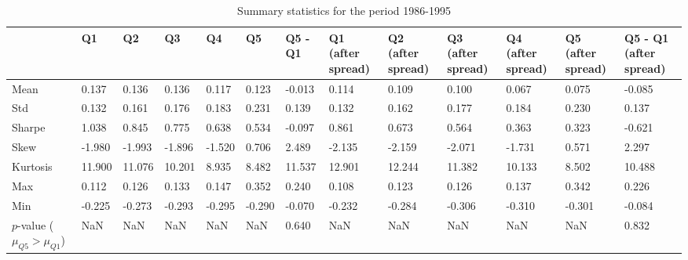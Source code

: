 \begin{table}
\caption{Summary statistics for the period 1986-1995}
\label{tab:summary_1986_1995}
\begin{tabular}{lllllllllllll}
\toprule
 & Q1 & Q2 & Q3 & Q4 & Q5 & Q5 - Q1 & Q1 (after spread) & Q2 (after spread) & Q3 (after spread) & Q4 (after spread) & Q5 (after spread) & Q5 - Q1 (after spread) \\
\midrule
Mean & 0.137 & 0.136 & 0.136 & 0.117 & 0.123 & -0.013 & 0.114 & 0.109 & 0.100 & 0.067 & 0.075 & -0.085 \\
Std & 0.132 & 0.161 & 0.176 & 0.183 & 0.231 & 0.139 & 0.132 & 0.162 & 0.177 & 0.184 & 0.230 & 0.137 \\
Sharpe & 1.038 & 0.845 & 0.775 & 0.638 & 0.534 & -0.097 & 0.861 & 0.673 & 0.564 & 0.363 & 0.323 & -0.621 \\
Skew & -1.980 & -1.993 & -1.896 & -1.520 & 0.706 & 2.489 & -2.135 & -2.159 & -2.071 & -1.731 & 0.571 & 2.297 \\
Kurtosis & 11.900 & 11.076 & 10.201 & 8.935 & 8.482 & 11.537 & 12.901 & 12.244 & 11.382 & 10.133 & 8.502 & 10.488 \\
Max & 0.112 & 0.126 & 0.133 & 0.147 & 0.352 & 0.240 & 0.108 & 0.123 & 0.126 & 0.137 & 0.342 & 0.226 \\
Min & -0.225 & -0.273 & -0.293 & -0.295 & -0.290 & -0.070 & -0.232 & -0.284 & -0.306 & -0.310 & -0.301 & -0.084 \\
$p$-value ($\mu_{Q5} > \mu_{Q1}$) & NaN & NaN & NaN & NaN & NaN & 0.640 & NaN & NaN & NaN & NaN & NaN & 0.832 \\
\bottomrule
\end{tabular}
\end{table}
